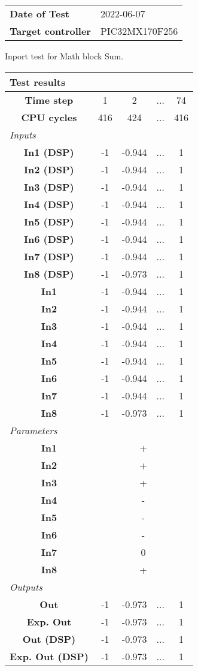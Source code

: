 \begin{tabular}{l l}
\textbf{Date of Test} & 2022-06-07 \tabularnewline
\textbf{Target controller} & PIC32MX170F256 \tabularnewline
\end{tabular}
\vspace{1ex}
Inport test for Math block Sum.

\vspace{1em}
\begin{tabularx}{\textwidth}{|c|c|c|>{\centering\arraybackslash}X|c|}
\hline
\multicolumn{5}{|l|}{\cellcolor[gray]{0.8}\textbf{Test results}} \tabularnewline \hline
\textbf{Time step} & 1 & 2 & ... & 74 \tabularnewline \hline
\textbf{CPU cycles} & 416 & 424 & ... & 416 \tabularnewline \hline
\multicolumn{5}{|l|}{\cellcolor[gray]{0.9}\textit{Inputs}} \tabularnewline \hline
\textbf{In1 (DSP)} & -1 & -0.944 & ... & 1 \tabularnewline \hline
\textbf{In2 (DSP)} & -1 & -0.944 & ... & 1 \tabularnewline \hline
\textbf{In3 (DSP)} & -1 & -0.944 & ... & 1 \tabularnewline \hline
\textbf{In4 (DSP)} & -1 & -0.944 & ... & 1 \tabularnewline \hline
\textbf{In5 (DSP)} & -1 & -0.944 & ... & 1 \tabularnewline \hline
\textbf{In6 (DSP)} & -1 & -0.944 & ... & 1 \tabularnewline \hline
\textbf{In7 (DSP)} & -1 & -0.944 & ... & 1 \tabularnewline \hline
\textbf{In8 (DSP)} & -1 & -0.973 & ... & 1 \tabularnewline \hline
\textbf{In1} & -1 & -0.944 & ... & 1 \tabularnewline \hline
\textbf{In2} & -1 & -0.944 & ... & 1 \tabularnewline \hline
\textbf{In3} & -1 & -0.944 & ... & 1 \tabularnewline \hline
\textbf{In4} & -1 & -0.944 & ... & 1 \tabularnewline \hline
\textbf{In5} & -1 & -0.944 & ... & 1 \tabularnewline \hline
\textbf{In6} & -1 & -0.944 & ... & 1 \tabularnewline \hline
\textbf{In7} & -1 & -0.944 & ... & 1 \tabularnewline \hline
\textbf{In8} & -1 & -0.973 & ... & 1 \tabularnewline \hline
\multicolumn{5}{|l|}{\cellcolor[gray]{0.9}\textit{Parameters}} \tabularnewline \hline
\textbf{In1} & \multicolumn{4}{c|}{+} \tabularnewline \hline
\textbf{In2} & \multicolumn{4}{c|}{+} \tabularnewline \hline
\textbf{In3} & \multicolumn{4}{c|}{+} \tabularnewline \hline
\textbf{In4} & \multicolumn{4}{c|}{-} \tabularnewline \hline
\textbf{In5} & \multicolumn{4}{c|}{-} \tabularnewline \hline
\textbf{In6} & \multicolumn{4}{c|}{-} \tabularnewline \hline
\textbf{In7} & \multicolumn{4}{c|}{0} \tabularnewline \hline
\textbf{In8} & \multicolumn{4}{c|}{+} \tabularnewline \hline
\multicolumn{5}{|l|}{\cellcolor[gray]{0.9}\textit{Outputs}} \tabularnewline \hline
\textbf{Out} & -1 & -0.973 & ... & 1 \tabularnewline \hline
\textbf{Exp. Out} & -1 & -0.973 & ... & 1 \tabularnewline \hline
\textbf{Out (DSP)} & -1 & -0.973 & ... & 1 \tabularnewline \hline
\textbf{Exp. Out (DSP)} & -1 & -0.973 & ... & 1 \tabularnewline \hline
\end{tabularx}
\vspace{1ex}


